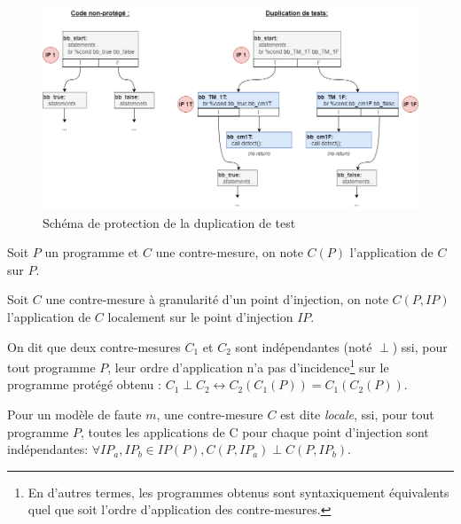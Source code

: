                 \begin{figure}[!tp]\centering
                    \includegraphics[scale=0.4]{ch5-placement/img/cm-mul-test-large-simple.drawio.png}
                    \caption{Schéma de protection de la duplication de test}
                    \label{fig:td-scheme}
                \end{figure}
                
                \begin{defi}
                    \label{def:cm-application}
                    Soit $P$ un programme et $C$ une contre-mesure, on note $C(P)$ l'application de $C$ sur $P$.
                \end{defi}
                \begin{defi}
                    \label{def:cm-application-local}
                    Soit $C$ une contre-mesure à granularité d'un point d'injection, on note $C(P, IP)$ l'application de $C$ localement sur le point d'injection $IP$.
                \end{defi}
                
                \begin{defi}
                    \label{def:cm-independance}
                    On dit que deux contre-mesures $C_1$ et $C_2$ sont indépendantes (noté $\perp$) ssi, pour tout programme $P$, leur ordre d'application n'a pas d'incidence\footnote{En d'autres termes, les programmes obtenus sont syntaxiquement équivalents quel que soit l'ordre d'application des contre-mesures.} sur le programme protégé obtenu :
                    $C_1 \perp C_2 \leftrightarrow C_2(C_1(P)) = C_1(C_2(P))$.
                \end{defi}
                
                \begin{defi}
                    \label{def:cm-local}
                    Pour un modèle de faute $m$, une contre-mesure $C$ est dite \textit{locale}, ssi, pour tout programme $P$, toutes les applications de C pour chaque point d'injection sont indépendantes: $\forall IP_a, IP_b \in IP(P), C(P, IP_a) \perp C(P, IP_b)$.
                \end{defi}
                
